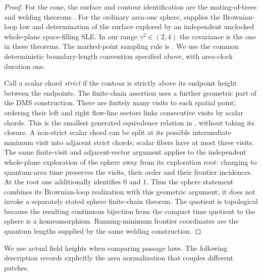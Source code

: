 \begin{proof}
For the cone, the surface and contour identification are the
mating-of-trees and welding theorems
\cite[Theorems~1.9 and~1.11]{DMSMating}. For the ordinary area-one sphere,
\cite[Theorem~1.1]{MillerSheffieldSphere} supplies the Brownian-loop law
and determination of the surface explored by an independent unclocked
whole-plane space-filling SLE. In our range $\gamma^2\in(2,4)$ the
covariance is the one in these theorems. The marked-point sampling rule
is \cite[Proposition~A.13]{DMSMating}. We use the common deterministic
boundary-length convention specified above, with area-clock duration one.

Call a scalar chord \emph{strict} if the contour is strictly above its
endpoint height between the endpoints.  The finite-chain assertion uses
a further geometric part of the DMS
construction. There are finitely many visits to each spatial point;
ordering their left and right flow-line sectors links consecutive visits
by scalar chords. This is the smallest generated equivalence relation in
\cite[Lemmas~8.9, 8.13--8.15 and Theorem~8.18]{DMSMating}, without taking
its closure. A non-strict scalar chord can be split at its possible
intermediate minimum visit into adjacent strict chords; scalar fibers
have at most three visits. The same finite-visit and adjacent-sector
argument applies to the independent whole-plane exploration of the
sphere away from its exploration root: changing to quantum-area time
preserves the visits, their order and their frontier incidences. At the
root one additionally identifies $0$ and $1$. Thus the sphere statement
combines its Brownian-loop realization with this geometric argument;
it does not invoke a separately stated sphere finite-chain theorem.
The quotient is topological because the resulting continuous bijection
from the compact time quotient to the sphere is a homeomorphism.
Running-minimum frontier coordinates are the quantum lengths supplied
by the same welding construction.
\end{proof}

We use actual field heights when comparing passage laws.  The following
description records explicitly the area normalization that couples
different patches.

